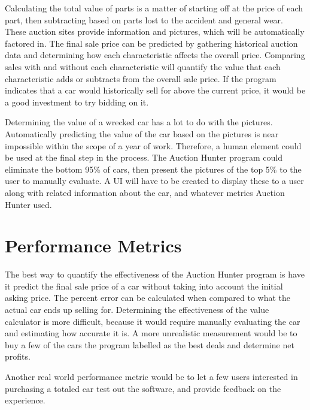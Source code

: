 \documentclass[draftclsnofoot,onecolumn,10pt]{IEEEtran}
\begin{document}
Calculating the total value of parts is a matter of starting off at the price of each part, then subtracting based on parts lost to the accident and general wear. These auction sites provide information and pictures, which will be automatically factored in. 
The final sale price can be predicted by gathering historical auction data and determining how each characteristic affects the overall price. Comparing sales with and without each characteristic will quantify the value that each characteristic adds or subtracts from the overall sale price. If the program indicates that a car would historically sell for above the current price, it would be a good investment to try bidding on it. 

Determining the value of a wrecked car has a lot to do with the pictures. Automatically predicting the value of the car based on the pictures is near impossible within the scope of a year of work. Therefore, a human element could be used at the final step in the process. The Auction Hunter program could eliminate the bottom 95\% of cars, then present the pictures of the top 5\% to the user to manually evaluate. A UI will have to be created to display these to a user along with related information about the car, and whatever metrics Auction Hunter used. 

\section{Performance Metrics}
The best way to quantify the effectiveness of the Auction Hunter program is have it predict the final sale price of a car without taking into account the initial asking price. The percent error can be calculated when compared to what the actual car ends up selling for. Determining the effectiveness of the value calculator is more difficult, because it would require manually evaluating the car and estimating how accurate it is. A more unrealistic measurement would be to buy a few of the cars the program labelled as the best deals and determine net profits.

Another real world performance metric would be to let a few users interested in purchasing a totaled car test out the software, and provide feedback on the experience. 
\end{document}
